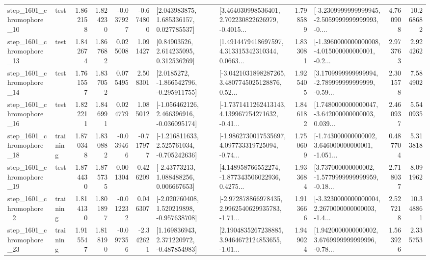 \begin{tabular}{llrrrrllrlrr}
 step\_1601\_chromophore\_10 &      test &      1.862158 &    1.824230 &     -0.037927 & -0.674800 &     [2.043983875, 1.685336157, 0.027785537] &  [3.464030998536401, 2.702230822626979, -0.4015... &       1.798589 &  [-3.2309999999999945, -2.5059999999999993, -0.... &            4.760908 &         10.268682 \\
 step\_1601\_chromophore\_13 &      test &      1.842674 &    1.867682 &      0.025008 &  1.091427 &      [0.84903526, 2.614235095, 0.312536269] &  [1.4914479418697597, 4.313315342310344, 0.0663... &       1.833081 &  [-1.3960000000000008, -4.015000000000001, -0.2... &            2.973763 &          2.924262 \\
 step\_1601\_chromophore\_14 &      test &      1.761557 &    1.837052 &      0.075495 &  2.508301 &     [2.0185272, -1.866542796, -0.295911755] &  [-3.0421031898287265, 3.4807745025128876, 0.52... &       1.925405 &  [3.1709999999999994, -2.789999999999999, -0.59... &            2.301578 &          7.584902 \\
 step\_1601\_chromophore\_16 &      test &      1.822211 &    1.846991 &      0.024779 &  1.085012 &   [-1.056462126, 2.466396916, -0.036095174] &  [-1.7371411262413143, 4.139967754271632, -0.41... &       1.846182 &  [1.7480000000000047, -3.642000000000003, 0.039... &            2.460937 &          5.540935 \\
 step\_1601\_chromophore\_18 &  training &      1.870348 &    1.830882 &     -0.039466 & -0.717977 &   [-1.216811633, 2.525761034, -0.705242636] &  [-1.9862730017535697, 4.097733319725094, -0.74... &       1.750609 &  [-1.743000000000002, 3.646000000000001, -1.051... &            0.487704 &          5.313818 \\
 step\_1601\_chromophore\_19 &      test &      1.874430 &    1.875735 &      0.001304 &  0.426209 &     [-2.43773213, 1.088488256, 0.006667653] &  [4.148958766552274, -1.877343506022936, 0.4275... &       1.933684 &  [3.737000000000002, -1.5779999999999959, -0.18... &            2.718037 &          8.091962 \\
  step\_1601\_chromophore\_2 &  training &      1.814130 &    1.801897 &     -0.012232 &  0.046307 &   [-2.020760408, 1.520219898, -0.957638708] &  [-2.972878866978435, 2.9962540629935783, -1.71... &       1.913666 &  [-3.3230000000000004, 2.2670000000000003, -1.4... &            2.527218 &         10.348861 \\
 step\_1601\_chromophore\_23 &  training &      1.915547 &    1.818190 &     -0.097356 & -2.342621 &    [1.169836943, 2.371220972, -0.487854983] &  [2.1904835267238885, 3.9464672124853655, -1.01... &       1.949024 &  [1.9420000000000002, 3.6769999999999996, -0.78... &            1.563926 &          2.335753 \\

\end{tabular}
